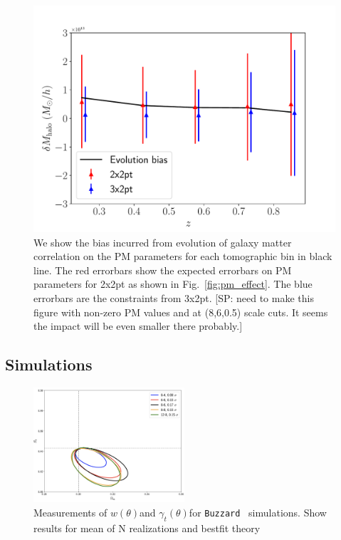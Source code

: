 \documentclass[fleqn,usenatbib]{mnras}
\newcommand{\gammat}{\ensuremath{\gamma_{t}(\theta)}}
\newcommand{\wtheta}{\ensuremath{w(\theta)}}
\newcommand{\buzzard}{\texttt{Buzzard} }
\newcommand{\SP}[1]{{\color{red}[SP: #1]}}
\begin{document}
\begin{figure}
\includegraphics[width=\columnwidth]{figs/PM_evolve_impact.pdf}
\caption[]{We show the bias incurred from evolution of galaxy matter correlation on the PM parameters for each tomographic bin in black line. The red errorbars show the expected errorbars on PM parameters for 2x2pt as shown in Fig.~\ref{fig:pm_effect}. The blue errorbars are the constraints from 3x2pt. \SP{need to make this figure with non-zero PM values and at (8,6,0.5) scale cuts. It seems the impact will be even smaller there probably.}
}
\label{fig:pm_evolve}
\end{figure}




\subsection{Simulations}

\begin{figure}
\includegraphics[width=0.5\textwidth,draft]{figs/temp.png}
\caption[]{Measurements of \wtheta and \gammat for \buzzard \ simulations. Show results for mean of N realizations and bestfit theory }
\label{fig:buzzard_2pt}
\end{figure}
\end{document}

